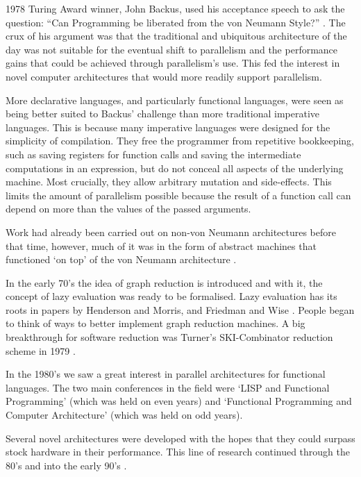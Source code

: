     1978 Turing Award winner, John Backus, used his acceptance speech to ask the
question: ``Can Programming be liberated from the von Neumann Style?''
\citep{HistoryOfHaskell}. The crux of his argument was that the traditional
and ubiquitous architecture of the day was not suitable for the eventual shift
to parallelism and the performance gains that could be achieved through
parallelism's use. This fed the
interest in novel computer architectures that would more readily support
parallelism.

More declarative languages, and particularly functional languages, were seen as
being better suited to Backus' challenge than more traditional imperative
languages. This is because many imperative languages were designed for the
simplicity of compilation. They free the programmer from repetitive
bookkeeping, such as saving registers for function calls and saving the
intermediate computations in an expression, but do not conceal all aspects of
the underlying machine. Most crucially, they allow arbitrary mutation and
side-effects. This limits the amount of parallelism possible because the result
of a function call can depend on more than the values of the passed arguments.

    Work had already been carried out on non-von Neumann architectures
before that time, however, much of it was in the form of abstract machines
that functioned `on top' of the von Neumann architecture \citep{turnerHistory}.

In the early 70's the idea of graph reduction is introduced \citep{wadsworth}
and with it, the concept of lazy evaluation was ready to be formalised.
Lazy evaluation has its roots in papers by Henderson and Morris, and Friedman
and Wise \citep{turnerHistory}.  People began to think of ways to better
implement graph reduction machines.  A big breakthrough for software reduction
was Turner's SKI-Combinator reduction scheme in 1979 \citep{turnerHistory,
clackbook}.

    In the 1980's we saw a great interest in parallel architectures for
functional languages. The two main conferences in the field were `LISP and
Functional Programming' (which was held on even years) and `Functional
Programming and Computer Architecture' (which was held on odd years).

    Several novel architectures were developed with the hopes that they could
surpass stock hardware in their performance. This line of research continued
through the 80's and into the early 90's \citep{Alice, GRIP, clackbook,
PFPAnIntro}.


